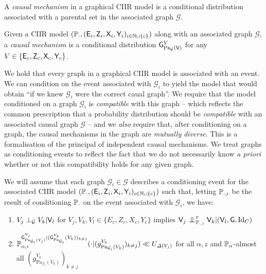 A \emph{causal mechanism} in a graphical CIIR model is a conditional distribution associated with a parental set in the associated graph $\mathcal{G}$.

\begin{definition}
Given a CIIR model $(\mathbb{P}_\cdot,(\mathsf{E}_i,\mathsf{Z}_{i},\mathsf{X}_i,\mathsf{Y}_i)_{i\in \mathbb{N}\cup\{c\}})$ along with an associated graph $\mathcal{G}$, a \emph{causal mechanism} is a conditional distribution $\mathsf{G}^{V}_{\mathrm{Pa}_{\mathcal{G}}(\mathsf{V})}$ for any $V\in \{\mathsf{E}_c,\mathsf{Z}_c,\mathsf{X}_c,\mathsf{Y}_c\}$.
\end{definition}

We hold that every graph in a graphical CIIR model is associated with an event. We can condition on the event associated with $\mathcal{G}_i$ to yield the model that would obtain ``if we knew $\mathcal{G}_i$ were the correct caual graph''. We require that the model conditioned on a graph $\mathcal{G}_i$ is \emph{compatible} with this graph -- which reflects the common prescription that a probability distribution should be \emph{compatible} with an associated causal graph $\mathcal{G}$\citet[Ch. ~1]{pearl_causality:_2009} -- and we \emph{also} require that, after conditioning on a graph, the causal mechanisms in the graph are \emph{mutually diverse}. This is a formalisation of the principal of independent causal mechanisms. We treat graphs as conditioning events to reflect the fact that we do not necessarily know \emph{a priori} whether or not this compatibility holds for any given graph.

\begin{definition}
We will assume that each graph $\mathcal{G}_i\in \mathscr{G}$ describes a conditioning event for the associated CIIR model $(\mathbb{P}_\cdot,(\mathsf{E}_i,\mathsf{Z}_{i},\mathsf{X}_i,\mathsf{Y}_i)_{i\in \mathbb{N}\cup\{c\}})$ such that, letting $\mathbb{P}_{\cdot,i}$ be the result of conditioning $\mathbb{P}_\cdot$ on the event associated with $\mathcal{G}_i$, we have:
\begin{enumerate}
	\item $V_j\perp_{\mathcal{G}} V_k|\mathsf{V}_l$ for $V_j,V_k,V_l\in \{E_c,Z_c,X_c,Y_c\}$ implies $\RV{V}_j\CI^e_{\prob{P}_{\cdot,i}} \RV{V}_k |(\RV{V}_l,\RV{G},\mathrm{Id}_C)$
	\item $\mathbb{P}_{\alpha,i}^{\mathsf{G}^{V_j}_{\mathrm{Pa}_{\mathcal{G}_i}(V_j)}|(\mathsf{G}^{V_k}_{\mathrm{Pa}_{\mathcal{G}_i}}(V_k))_{k\neq j}}(\cdot|(g^{V_k}_{\mathrm{Pa}_{\mathcal{G}_i}(V_k)})_{k\neq j}) \ll U_{\Delta(V_j)}$ for all $\alpha, z$ and $\mathbb{P}_\alpha$-almost all $(g^{V_k}_{\mathrm{Pa}_{\mathcal{G}_i}(V_k)})_{k\neq j}$
\end{enumerate}
\end{definition}

